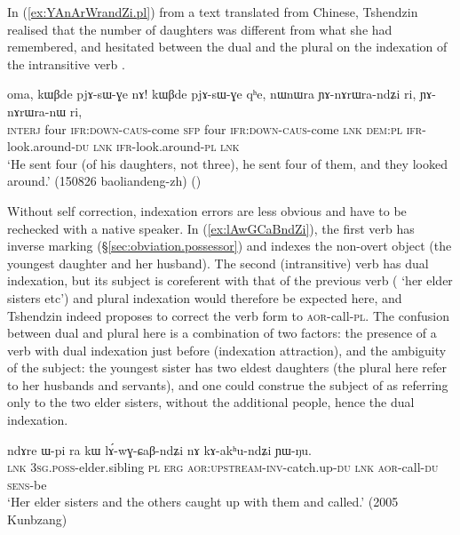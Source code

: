 In (\ref{ex:YAnArWrandZi.pl}) from a text translated from Chinese, Tshendzin realised that the number of daughters was different from what she had  remembered, and hesitated between the dual and the plural on the indexation of the intransitive verb .

\begin{exe}
\ex \label{ex:YAnArWrandZi.pl}
\gll oma, kɯβde pjɤ-sɯ-ɣe nɤ! kɯβde pjɤ-sɯ-ɣe qʰe, nɯnɯra ɲɤ-nɤrɯra-ndʑi ri, ɲɤ-nɤrɯra-nɯ ri, \\
\textsc{interj} four \textsc{ifr}:\textsc{down}-\textsc{caus}-come \textsc{sfp} four \textsc{ifr}:\textsc{down}-\textsc{caus}-come \textsc{lnk} \textsc{dem}:\textsc{pl} \textsc{ifr}-look.around-\textsc{du} \textsc{lnk} \textsc{ifr}-look.around-\textsc{pl} \textsc{lnk} \\
\glt `He sent four (of his daughters, not three), he sent four of them, and they looked around.' (150826 baoliandeng-zh) ()
\end{exe} 

Without self correction, indexation errors are less obvious and have to be rechecked with a native speaker. In (\ref{ex:lAwGCaBndZi}), the first verb  has inverse marking (§\ref{sec:obviation.possessor}) and indexes the non-overt object (the youngest daughter and her husband). The second (intransitive) verb has dual indexation, but its subject is coreferent with that of the previous verb ( `her elder sisters etc') and plural indexation would therefore be expected here, and Tshendzin indeed proposes to correct the verb form to  \textsc{aor}-call-\textsc{pl}. The confusion between dual and plural here is a combination of two factors: the presence of a verb with dual indexation just before (indexation attraction), and the ambiguity of the subject: the youngest sister has two eldest daughters (the plural here refer to her husbands and servants), and one could construe the subject of  as referring only to the two elder sisters, without the additional people, hence the dual indexation.

\begin{exe}
\ex \label{ex:lAwGCaBndZi}
\gll  ndɤre ɯ-pi ra kɯ lɤ́-wɣ-ɕaβ-ndʑi nɤ kɤ-akʰu-ndʑi ɲɯ-ŋu. \\
\textsc{lnk} \textsc{3sg}.\textsc{poss}-elder.sibling \textsc{pl} \textsc{erg} \textsc{aor}:\textsc{upstream}-\textsc{inv}-catch.up-\textsc{du} \textsc{lnk} \textsc{aor}-call-\textsc{du} \textsc{sens}-be \\
\glt `Her elder sisters and the others caught up with them and called.' (2005 Kunbzang)
\end{exe} 

